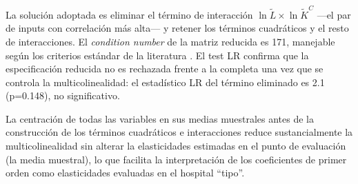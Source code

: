 La solución adoptada es eliminar el término de interacción $\ln\tilde{L}\times\ln\tilde{K}^C$ ---el par de inputs con correlación más alta--- y retener los términos cuadráticos y el resto de interacciones. El \textit{condition number} de la matriz reducida es 171, manejable según los criterios estándar de la literatura \citep{kumbhakar2000}. El test LR confirma que la especificación reducida no es rechazada frente a la completa una vez que se controla la multicolinealidad: el estadístico LR del término eliminado es 2.1 (p=0.148), no significativo.

La centración de todas las variables en sus medias muestrales antes de la construcción de los términos cuadráticos e interacciones reduce sustancialmente la multicolinealidad sin alterar la elasticidades estimadas en el punto de evaluación (la media muestral), lo que facilita la interpretación de los coeficientes de primer orden como elasticidades evaluadas en el hospital ``tipo''.



